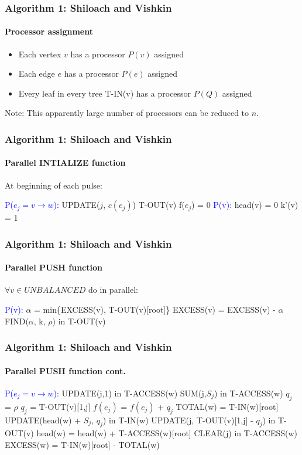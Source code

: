 \documentclass{beamer}
\begin{document}
\begin{frame}
\frametitle{Algorithm 1: Shiloach and Vishkin}
\framesubtitle{Processor assignment} 
\begin{itemize}
	\item Each vertex $v$ has a processor $P(v)$ assigned
	\item Each edge $e$ has a processor $P(e)$ assigned
	\item Every leaf in every tree T-IN(v) has a processor $P(Q)$ assigned
\end{itemize}
\bigskip
Note: This apparently large number of processors can be reduced to $n$.
\end{frame}

\begin{frame}
\frametitle{Algorithm 1: Shiloach and Vishkin}
\framesubtitle{Parallel INTIALIZE function} 
At beginning of each pulse:	
	\begin{algorithmic}[1]
		\State \textcolor{blue}{P($e_j = v \rightarrow w$):}
		\State UPDATE($j$, $c(e_j)$) T-OUT(v)
		\State f($e_j$) = 0
		\State \textcolor{blue}{P(v):}
		\State head(v) = 0	
		\State k'(v) = 1	
 	\EndFunction
	\end{algorithmic}
\end{frame}

\begin{frame}
\frametitle{Algorithm 1: Shiloach and Vishkin}
\framesubtitle{Parallel PUSH function} 
$\forall v \in UNBALANCED$ do in parallel:
	\begin{algorithmic}[1]
		\State \textcolor{blue}{P(v):}
		\State $\alpha$ = min\{EXCESS(v), T-OUT(v)[root]\} 
		\State EXCESS(v) = EXCESS(v) - $\alpha$
		\State FIND($\alpha$, k, $\rho$) in T-OUT(v)
 	\EndFunction
	\end{algorithmic}
\end{frame}

\begin{frame}[shrink]
\frametitle{Algorithm 1: Shiloach and Vishkin}
\framesubtitle{Parallel PUSH function cont.} 
\begin{algorithmic}[1]
	\State \textcolor{blue}{P($e_j = v \rightarrow w$):}
 	\State UPDATE(j,1) in T-ACCESS(w)
	\State SUM(j,$S_j$) in T-ACCESS(w)
		$q_j$ = $\rho$
	\Else
		\State $q_j$ = T-OUT(v)[1,j]
	\EndIf
	\State $f(e_j)$ = $f(e_j)$ + $q_j$
	\State TOTAL(w) = T-IN(w)[root]
	\State UPDATE(head(w) + $S_j$, $q_j$) in T-IN(w)
	\State UPDATE(j, T-OUT(v)[1,j] - $q_j$) in T-OUT(v)
	\State head(w) = head(w) + T-ACCESS(w)[root] 
	\State CLEAR(j) in T-ACCESS(w)
	\State EXCESS(w) = T-IN(w)[root] - TOTAL(w)
	\EndIf
\end{algorithmic}
\end{frame}
\end{document}
